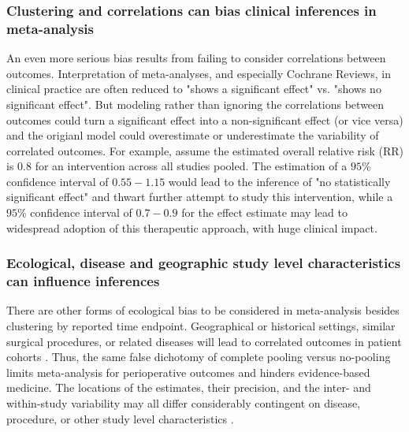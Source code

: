 \documentclass[11pt,notitlepage]{article}
\begin{document}
\subsubsection*{Clustering and correlations can bias clinical inferences in meta-analysis }
An even more serious bias results from failing to consider correlations 
between outcomes. Interpretation of meta-analyses, and especially Cochrane Reviews, in clinical practice 
are often reduced to "shows a significant effect" vs. "shows no significant effect". But modeling rather than
ignoring the correlations between outcomes could turn a significant effect into a non-significant effect 
(or vice versa) and the origianl model could overestimate or underestimate the variability of correlated outcomes. 
For example, assume the estimated overall relative risk (RR) is $0.8$ for an 
intervention across all studies pooled. The estimation of a $95$\% confidence 
interval of $0.55-1.15$ would lead to the inference of "no statistically 
significant effect" and thwart further attempt to study this intervention, 
while a $95$\% confidence interval of $0.7-0.9$ for the effect estimate may 
lead to widespread adoption of this therapeutic approach, with huge clinical impact.

\subsubsection*{Ecological, disease and geographic study level characteristics can influence inferences}
There are other forms of ecological bias to be considered in meta-analysis besides clustering by reported time endpoint. Geographical or 
historical settings, similar surgical procedures, or related diseases will lead to correlated outcomes in patient cohorts 
\cite{Abroug2011,Andreae2013,Andreae2015,Roth2015CriticalCare}. 
Thus, the same false dichotomy of complete pooling versus no-pooling limits meta-analysis for perioperative outcomes and hinders evidence-based 
medicine. The locations of the estimates, their precision, and the inter- and within-study variability may all differ considerably 
contingent on disease, procedure, or other study level characteristics \cite{Andreae2013,Andreae2015,Roth2015CriticalCare}.
\end{document}
